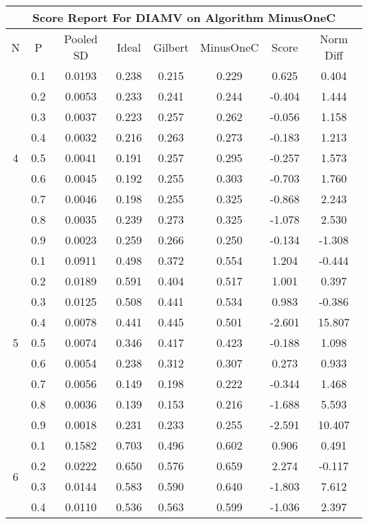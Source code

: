 \documentclass[11pt,a4paper]{report}
\begin{document}
\begin{longtable}{ | c | c || c | c | c | c | c | c | }
\hline
\multicolumn{8}{|c|}{ Score Report For DIAMV on Algorithm MinusOneC} \\
\hline
N & P & Pooled SD &  Ideal &  Gilbert & MinusOneC  & Score & Norm Diff \\
 \hline
 \hline
 \endhead
\multirow{9}{*}{4} & 0.1 & 0.0193 & 0.238 & 0.215 & 0.229 & 0.625 & 0.404 \\
 & 0.2 & 0.0053 & 0.233 & 0.241 & 0.244 & -0.404 & 1.444 \\
 & 0.3 & 0.0037 & 0.223 & 0.257 & 0.262 & -0.056 & 1.158 \\
 & 0.4 & 0.0032 & 0.216 & 0.263 & 0.273 & -0.183 & 1.213 \\
 & 0.5 & 0.0041 & 0.191 & 0.257 & 0.295 & -0.257 & 1.573 \\
 & 0.6 & 0.0045 & 0.192 & 0.255 & 0.303 & -0.703 & 1.760 \\
 & 0.7 & 0.0046 & 0.198 & 0.255 & 0.325 & -0.868 & 2.243 \\
 & 0.8 & 0.0035 & 0.239 & 0.273 & 0.325 & -1.078 & 2.530 \\
 & 0.9 & 0.0023 & 0.259 & 0.266 & 0.250 & -0.134 & -1.308 \\
 \hline
\multirow{9}{*}{5} & 0.1 & 0.0911 & 0.498 & 0.372 & 0.554 & 1.204 & -0.444 \\
 & 0.2 & 0.0189 & 0.591 & 0.404 & 0.517 & 1.001 & 0.397 \\
 & 0.3 & 0.0125 & 0.508 & 0.441 & 0.534 & 0.983 & -0.386 \\
 & 0.4 & 0.0078 & 0.441 & 0.445 & 0.501 & -2.601 & 15.807 \\
 & 0.5 & 0.0074 & 0.346 & 0.417 & 0.423 & -0.188 & 1.098 \\
 & 0.6 & 0.0054 & 0.238 & 0.312 & 0.307 & 0.273 & 0.933 \\
 & 0.7 & 0.0056 & 0.149 & 0.198 & 0.222 & -0.344 & 1.468 \\
 & 0.8 & 0.0036 & 0.139 & 0.153 & 0.216 & -1.688 & 5.593 \\
 & 0.9 & 0.0018 & 0.231 & 0.233 & 0.255 & -2.591 & 10.407 \\
 \hline
\multirow{9}{*}{6} & 0.1 & 0.1582 & 0.703 & 0.496 & 0.602 & 0.906 & 0.491 \\
 & 0.2 & 0.0222 & 0.650 & 0.576 & 0.659 & 2.274 & -0.117 \\
 & 0.3 & 0.0144 & 0.583 & 0.590 & 0.640 & -1.803 & 7.612 \\
 & 0.4 & 0.0110 & 0.536 & 0.563 & 0.599 & -1.036 & 2.397 \\

\end{longtable}
\end{document}
